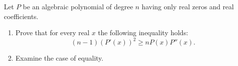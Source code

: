 \documentclass{article}
\begin{document}
	\setlength{\parindent}{0pt}
	Let $P$ be an algebraic polynomial of degree $n$ having only real zeros and real coefficients.
	\begin{enumerate}[label=\alph*)]
		\item  Prove that for every real $x$ the following inequality holds:
		$$(n-1)(P'(x))^2\geq nP(x)P''(x).$$
		\item  Examine the case of equality.
	\end{enumerate}
\end{document}
